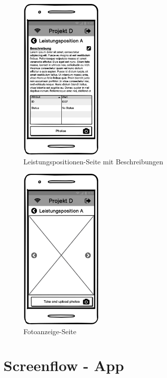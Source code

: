 \begin{figure}[ht]
	\centering
	\includegraphics[width=4cm, height=8cm]{img/mockup-app/Leistungsposition.png}
	\caption{Leistungspositionen-Seite mit Beschreibungen}
\end{figure}

\begin{figure}[ht]
	\centering
	\includegraphics[width=4cm, height=8cm]{img/mockup-app/Photos.png}
	\caption{Fotoanzeige-Seite}
\end{figure}

\clearpage

\section{Screenflow - App}

